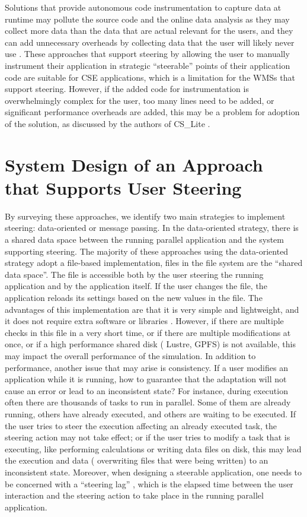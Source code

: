 Solutions that provide autonomous code instrumentation to
capture data at runtime may pollute the source code and the online data
analysis as they may collect more data than the data that are actual
relevant for the users, and they can add unnecessary overheads by
collecting data that the user will likely never use
\cite{Silva2018Capturing,Stamatogiannakis2016Trade-Offs}.
These approaches that support steering by allowing the user
to manually instrument their application in strategic ``steerable''
points of their application code are suitable for CSE applications,
which is a limitation for the WMSs that support steering. However, if
the added code for instrumentation is overwhelmingly complex for the
user, too many lines need to be added, or significant performance
overheads are added, this may be a problem for adoption of the solution,
as discussed by the authors of CS\_Lite
\cite{Figueira2004CS_LITE:}.



\section{System Design of an Approach that Supports User Steering}

By surveying these approaches, we identify two main strategies to implement steering: data-oriented or message
passing. In the data-oriented strategy, there is a shared data space
between the running parallel application and the system supporting
steering. The majority of these approaches using the data-oriented strategy
adopt a file-based implementation, \ie{} files in the file system
are the ``shared data space''. The file is accessible both by the user
steering the running application and by the application itself. If the
user changes the file, the application reloads its settings based on the
new values in the file. The advantages of this implementation are that
it is very simple and lightweight, and it does not require extra
software or libraries \cite{Pickles2005practical}.
However, if there are multiple checks in this file in a very short
time, or if there are multiple modifications at once, or if a
high performance shared disk (\eg{} Lustre, GPFS) is not
available, this may impact the overall performance of the simulation. In
addition to performance, another issue that may arise is consistency. If
a user modifies an application while it is running, how to guarantee
that the adaptation will not cause an error or lead to an inconsistent
state? For instance, during execution often there are thousands of tasks
to run in parallel. Some of them are already running, others have
already executed, and others are waiting to be executed. If the user
tries to steer the execution affecting an already executed task, the
steering action may not take effect; or if the user tries to modify a
task that is executing, like performing calculations or writing data
files on disk, this may lead the execution and data (\eg{}
overwriting files that were being written) to an inconsistent state.
Moreover, when designing a steerable application, one needs to be
concerned with a ``steering lag'' \cite{Hart1999Consistency},
which is the elapsed time between the user interaction and the steering
action to take place in the running parallel application.

